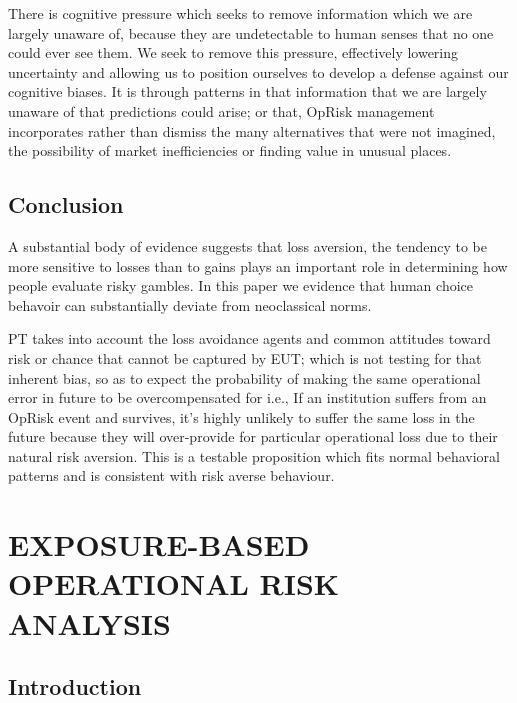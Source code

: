 \documentclass{DissertateUSU}
\begin{document}
There is cognitive pressure which seeks to remove information which we
are largely unaware of, because they are undetectable to human senses
that no one could ever see them. We seek to remove this pressure,
effectively lowering uncertainty and allowing us to position ourselves
to develop a defense against our cognitive biases. It is through
patterns in that information that we are largely unaware of that
predictions could arise; or that, OpRisk management incorporates rather
than dismiss the many alternatives that were not imagined, the
possibility of market inefficiencies or finding value in unusual places.

\section{Conclusion}
\label{sec:Conclusion}

A substantial body of evidence suggests that loss aversion, the tendency
to be more sensitive to losses than to gains plays an important role in
determining how people evaluate risky gambles. In this paper we evidence
that human choice behavoir can substantially deviate from neoclassical
norms.\medskip

PT takes into account the loss avoidance agents and common attitudes
toward risk or chance that cannot be captured by EUT; which is not
testing for that inherent bias, so as to expect the probability of
making the same operational error in future to be overcompensated for
i.e., If an institution suffers from an OpRisk event and survives, it's
highly unlikely to suffer the same loss in the future because they will
over-provide for particular operational loss due to their natural risk
aversion. This is a testable proposition which fits normal behavioral
patterns and is consistent with risk averse behaviour.

\singlespacing

\FloatBarrier
\newpage
{}
\fancyhead[R]{\thepage}
\fancyfoot[C]{}

\chapter{EXPOSURE-BASED OPERATIONAL RISK ANALYSIS}

\doublespacing

\section{Introduction}
\label{sec3:Introduction}
\end{document}
